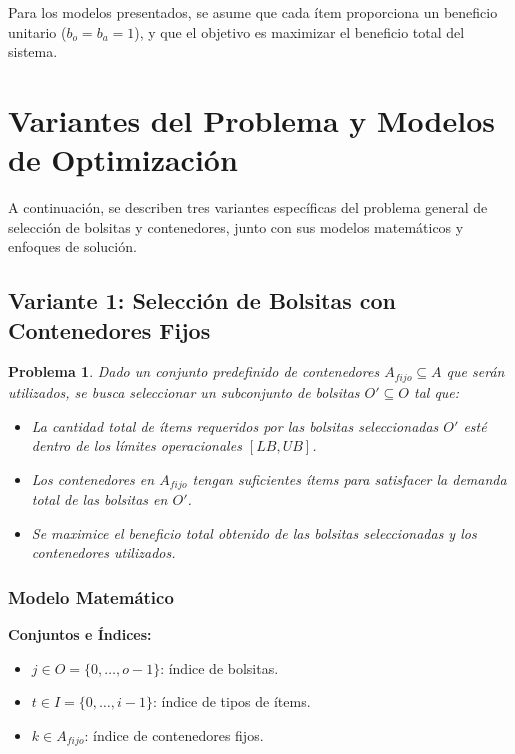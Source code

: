 \documentclass[a4paper,12pt]{article}
\newtheorem{problem}{Problema}
\begin{document}
Para los modelos presentados, se asume que cada ítem proporciona un beneficio unitario ($b_o = b_a = 1$), y que el objetivo es maximizar el beneficio total del sistema.

\section{Variantes del Problema y Modelos de Optimización}
A continuación, se describen tres variantes específicas del problema general de selección de bolsitas y contenedores, junto con sus modelos matemáticos y enfoques de solución.

\subsection{Variante 1: Selección de Bolsitas con Contenedores Fijos}
\label{sec:variante1}
\begin{problem}
Dado un conjunto predefinido de contenedores $A_{fijo} \subseteq A$ que serán utilizados, se busca seleccionar un subconjunto de bolsitas $O' \subseteq O$ tal que:
\begin{itemize}
    \item La cantidad total de ítems requeridos por las bolsitas seleccionadas $O'$ esté dentro de los límites operacionales $[LB, UB]$.
    \item Los contenedores en $A_{fijo}$ tengan suficientes ítems para satisfacer la demanda total de las bolsitas en $O'$.
    \item Se maximice el beneficio total obtenido de las bolsitas seleccionadas y los contenedores utilizados.
\end{itemize}
\end{problem}

\subsubsection{Modelo Matemático}
\textbf{Conjuntos e Índices:}
\begin{itemize}
    \item $j \in O = \{0, \dots, o-1\}$: índice de bolsitas.
    \item $t \in I = \{0, \dots, i-1\}$: índice de tipos de ítems.
    \item $k \in A_{fijo}$: índice de contenedores fijos.
\end{itemize}
\end{document}
